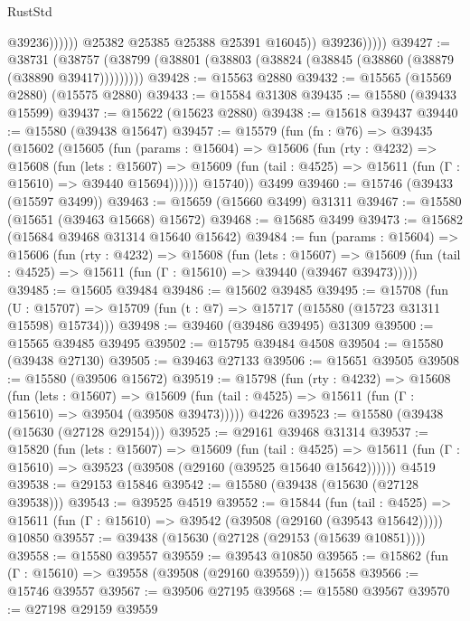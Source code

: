 \begin{lexlean}{RustStd}
\begin{coremodule}
                              @39236))))))
                  @25382
                  @25385
                  @25388
                  @25391
                  @16045))
              @39236)))))
@39427 := @38731
    (@38757 (@38799 (@38801 (@38803 (@38824 (@38845 (@38860 (@38879 (@38890 @39417)))))))))
@39428 := @15563 @2880
@39432 := @15565 (@15569 @2880) (@15575 @2880)
@39433 := @15584 @31308
@39435 := @15580 (@39433 @15599)
@39437 := @15622 (@15623 @2880)
@39438 := @15618 @39437
@39440 := @15580 (@39438 @15647)
@39457 := @15579
    (fun (fn : @76) =>
    @39435
      (@15602
        (@15605
          (fun (params : @15604) =>
          @15606
            (fun (rty : @4232) =>
            @15608
              (fun (lets : @15607) =>
              @15609 (fun (tail : @4525) => @15611 (fun (Γ : @15610) => @39440 @15694))))))
        @15740))
    @3499
@39460 := @15746 (@39433 (@15597 @3499))
@39463 := @15659 (@15660 @3499) @31311
@39467 := @15580 (@15651 (@39463 @15668) @15672)
@39468 := @15685 @3499
@39473 := @15682 (@15684 @39468 @31314 @15640 @15642)
@39484 := fun (params : @15604) =>
  @15606
    (fun (rty : @4232) =>
    @15608
      (fun (lets : @15607) =>
      @15609 (fun (tail : @4525) => @15611 (fun (Γ : @15610) => @39440 (@39467 @39473)))))
@39485 := @15605 @39484
@39486 := @15602 @39485
@39495 := @15708
    (fun (U : @15707) => @15709 (fun (t : @7) => @15717 (@15580 (@15723 @31311 @15598) @15734)))
@39498 := @39460 (@39486 @39495) @31309
@39500 := @15565 @39485 @39495
@39502 := @15795 @39484 @4508
@39504 := @15580 (@39438 @27130)
@39505 := @39463 @27133
@39506 := @15651 @39505
@39508 := @15580 (@39506 @15672)
@39519 := @15798
    (fun (rty : @4232) =>
    @15608
      (fun (lets : @15607) =>
      @15609 (fun (tail : @4525) => @15611 (fun (Γ : @15610) => @39504 (@39508 @39473)))))
    @4226
@39523 := @15580 (@39438 (@15630 (@27128 @29154)))
@39525 := @29161 @39468 @31314
@39537 := @15820
    (fun (lets : @15607) =>
    @15609
      (fun (tail : @4525) =>
      @15611 (fun (Γ : @15610) => @39523 (@39508 (@29160 (@39525 @15640 @15642))))))
    @4519
@39538 := @29153 @15846
@39542 := @15580 (@39438 (@15630 (@27128 @39538)))
@39543 := @39525 @4519
@39552 := @15844
    (fun (tail : @4525) => @15611 (fun (Γ : @15610) => @39542 (@39508 (@29160 (@39543 @15642)))))
    @10850
@39557 := @39438 (@15630 (@27128 (@29153 (@15639 @10851))))
@39558 := @15580 @39557
@39559 := @39543 @10850
@39565 := @15862 (fun (Γ : @15610) => @39558 (@39508 (@29160 @39559))) @15658
@39566 := @15746 @39557
@39567 := @39506 @27195
@39568 := @15580 @39567
@39570 := @27198 @29159 @39559

\end{coremodule}
\end{lexlean}
